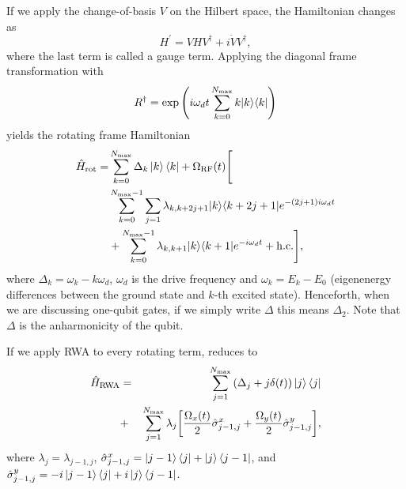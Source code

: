 If we apply the change-of-basis $V$ on the Hilbert space, the Hamiltonian changes as
\begin{equation}
  H^\prime = VHV^\dagger + i\dot{V}V^\dagger,
  \label{eq:framechange}
\end{equation}
where the last term is called a gauge term.
Applying the diagonal frame transformation with
\begin{equation}
  R\updag = \exp\left(i\wdrive t\sumkk[\Nmax] k\ketbra{k}{k}\right)
\end{equation}
yields the rotating frame Hamiltonian
\begin{align}
  \hat{H}_{\text{rot}}= & \sum_{k=0}^{N_{{\rm{max}}}}{\Delta}_{k}\ket{k}\bra{k}+ \Omega_{\mathrm{RF}}(t)
  \Biggr[\nonumber                                                                                         \\
         & \sum_{k=0}^{N_{\rm{max}}-1}\sum_{j=1}\lambda_{k,k+2j+1}\vert k \rangle \langle k+2j+1 \vert e^{-(2j+1)i\omega_d t}
  \nonumber                                                                                                \\
         & +
    \sum_{k=0}^{N_{{\rm{max}}}-1}\lambda_{k,k+1}\vert k \rangle \langle k+1 \vert e^{-i\omega_d t}
    +\rm{h.c.}
    \Biggr]
  ,
  \label{eq:rotatingframe}
\end{align}
where ${\Delta}_k = \omega_k - k\omega_d$, $\omega_d$ is the drive frequency and $\omega_k = E_k - E_0$ (eigenenergy
differences between the ground state and $k$-th excited state).
Henceforth, when we are discussing one-qubit gates, if we simply write $\Delta$ this means $\Delta_2$.
Note that $\Delta$ is the anharmonicity of the qubit.

If we apply RWA to every rotating term,  reduces to
\begin{eqnarray}\nonumber
  \Hrwa &=& \sum_{j=1}^{\Nmax} \left(\Delta_j+j\delta(t)\right)\ket{j}\bra{j}\\
  &+&\sum_{j=1}^{\Nmax}\lambda_j\bigg[\frac{\Omega_x(t)}{2} \hat{\sigma}^x_{j-1, j}+\frac{\Omega_y(t)}{2} \hat{\sigma}^y_{j-1, j}\bigg],
  \label{eq:Hrwa}
\end{eqnarray}
where $\lambda_j = \lambda_{j-1,j}$, $\hat{\sigma}^x_{j-1,j} = \ket{j-1}\bra{j} + \ket{j}\bra{j-1}$, and
$\hat{\sigma}^y_{j-1,j} = -i\ket{j-1}\bra{j} + i\ket{j}\bra{j-1}$.

